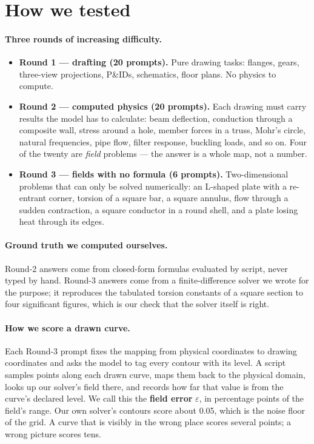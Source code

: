\documentclass[11pt,a4paper]{article}
\begin{document}
\section{How we tested}
\paragraph{Three rounds of increasing difficulty.}
\begin{itemize}[leftmargin=2em,itemsep=2pt]
  \item \textbf{Round 1 --- drafting (20 prompts).} Pure drawing tasks: flanges, gears, three-view projections, P\&IDs, schematics, floor plans. No physics to compute.
  \item \textbf{Round 2 --- computed physics (20 prompts).} Each drawing must carry results the model has to calculate: beam deflection, conduction through a composite wall, stress around a hole, member forces in a truss, Mohr's circle, natural frequencies, pipe flow, filter response, buckling loads, and so on. Four of the twenty are \emph{field} problems --- the answer is a whole map, not a number.
  \item \textbf{Round 3 --- fields with no formula (6 prompts).} Two-dimensional problems that can only be solved numerically: an L-shaped plate with a re-entrant corner, torsion of a square bar, a square annulus, flow through a sudden contraction, a square conductor in a round shell, and a plate losing heat through its edges.
\end{itemize}

\paragraph{Ground truth we computed ourselves.} Round-2 answers come from closed-form formulas evaluated by script, never typed by hand. Round-3 answers come from a finite-difference solver we wrote for the purpose; it reproduces the tabulated torsion constants of a square section to four significant figures, which is our check that the solver itself is right.

\paragraph{How we score a drawn curve.} Each Round-3 prompt fixes the mapping from physical coordinates to drawing coordinates and asks the model to tag every contour with its level. A script samples points along each drawn curve, maps them back to the physical domain, looks up our solver's field there, and records how far that value is from the curve's declared level. We call this the \textbf{field error} $\varepsilon$, in percentage points of the field's range. Our own solver's contours score about 0.05, which is the noise floor of the grid. A curve that is visibly in the wrong place scores several points; a wrong picture scores tens.
\end{document}
